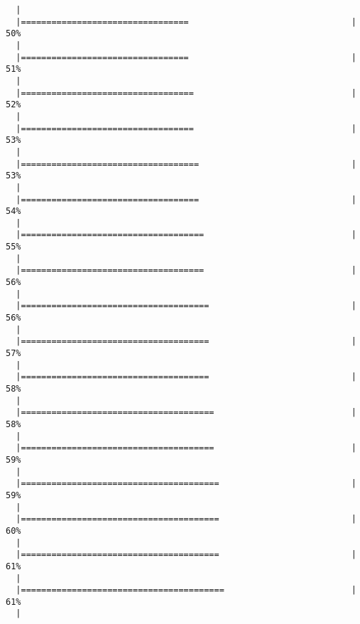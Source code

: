 \begin{knitrout}
\begin{kframe}
\begin{verbatim}
  |                                                                       
  |=================================                                |  50%
  |                                                                       
  |=================================                                |  51%
  |                                                                       
  |==================================                               |  52%
  |                                                                       
  |==================================                               |  53%
  |                                                                       
  |===================================                              |  53%
  |                                                                       
  |===================================                              |  54%
  |                                                                       
  |====================================                             |  55%
  |                                                                       
  |====================================                             |  56%
  |                                                                       
  |=====================================                            |  56%
  |                                                                       
  |=====================================                            |  57%
  |                                                                       
  |=====================================                            |  58%
  |                                                                       
  |======================================                           |  58%
  |                                                                       
  |======================================                           |  59%
  |                                                                       
  |=======================================                          |  59%
  |                                                                       
  |=======================================                          |  60%
  |                                                                       
  |=======================================                          |  61%
  |                                                                       
  |========================================                         |  61%
  |                                                                       

\end{verbatim}
\end{kframe}
\end{knitrout}

